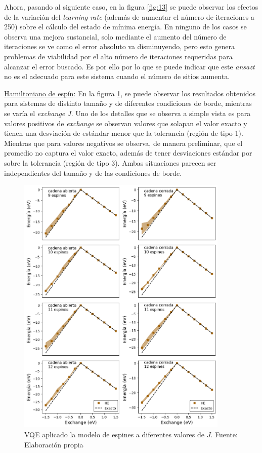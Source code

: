 Ahora, pasando al siguiente caso, en la figura \ref{fig:13} se puede observar los efectos de la variación del \textit{learning rate} (además de aumentar el número de iteraciones a 250) sobre el cálculo del estado de mínima energía. En ninguno de los casos se observa una mejora sustancial, solo mediante el aumento del número de iteraciones se ve como el error absoluto va disminuyendo, pero esto genera problemas de viabilidad por el alto número de iteraciones requeridas para alcanzar el error buscado. Es por ello por lo que se puede indicar que este \textit{ansazt} no es el adecuado para este sistema cuando el número de sitios aumenta.

\underline{Hamiltoniano de espín}: 
En la figura \ref{fig:1}, se puede observar los resultados obtenidos para sistemas de distinto tamaño y de diferentes condiciones de borde, mientras se varía el \textit{exchange} $J$. Uno de los detalles que se observa a simple vista es para valores positivos de \textit{exchange} se observan valores que solapan el valor exacto y tienen una desviación de estándar menor que la tolerancia (región de tipo 1). Mientras que para valores negativos se observa, de manera preliminar, que el promedio no captura el valor exacto, además de tener desviaciones estándar por sobre la tolerancia (región de tipo 3). Ambas situaciones parecen ser independientes del tamaño y de las condiciones de borde.

\begin{figure}[H]
\centering
\includegraphics[width=0.9\textwidth]{figures/S4/spins/barridoespines.png}
\caption{\label{fig:1} VQE aplicado la modelo de espines a diferentes valores de $J$. Fuente: Elaboración propia}
\end{figure}

